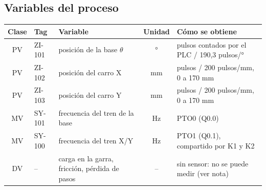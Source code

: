 \documentclass[a4paper,11pt]{article}
\begin{document}
\subsection{Variables del proceso}
\begin{center}\small
\begin{tabularx}{\linewidth}{c >{\ttfamily}p{1.6cm} >{\raggedright}p{4.2cm} c >{\raggedright\arraybackslash}X}
\toprule
\textbf{Clase} & \textrm{\textbf{Tag}} & \textbf{Variable} & \textbf{Unidad} & \textbf{Cómo se obtiene}\\
\midrule
PV & ZI-101 & posición de la base $\theta$ & ° & pulsos contados por el PLC / 190,3 pulsos/°\\
PV & ZI-102 & posición del carro X & mm & pulsos / 200 pulsos/mm, 0 a 170 mm\\
PV & ZI-103 & posición del carro Y & mm & pulsos / 200 pulsos/mm, 0 a 170 mm\\
MV & SY-101 & frecuencia del tren de la base & Hz & PTO0 (Q0.0)\\
MV & SY-100 & frecuencia del tren X/Y & Hz & PTO1 (Q0.1), compartido por K1 y K2\\
DV & -- & carga en la garra, fricción, pérdida de pasos & -- & sin sensor: no se puede medir (ver nota)\\
\bottomrule
\end{tabularx}
\end{center}

\end{document}
